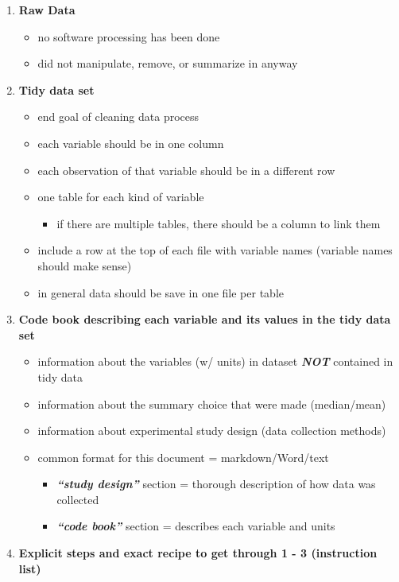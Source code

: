 \documentclass[
]{article}
\providecommand{\tightlist}{%
  \setlength{\itemsep}{0pt}\setlength{\parskip}{0pt}}
\begin{document}
\begin{enumerate}
\def\labelenumi{\arabic{enumi}.}
\tightlist
\item
  \textbf{Raw Data}

  \begin{itemize}
  \tightlist
  \item
    no software processing has been done
  \item
    did not manipulate, remove, or summarize in anyway
  \end{itemize}
\item
  \textbf{Tidy data set}

  \begin{itemize}
  \tightlist
  \item
    end goal of cleaning data process
  \item
    each variable should be in one column
  \item
    each observation of that variable should be in a different row
  \item
    one table for each kind of variable

    \begin{itemize}
    \tightlist
    \item
      if there are multiple tables, there should be a column to link
      them
    \end{itemize}
  \item
    include a row at the top of each file with variable names (variable
    names should make sense)
  \item
    in general data should be save in one file per table
  \end{itemize}
\item
  \textbf{Code book describing each variable and its values in the tidy
  data set}

  \begin{itemize}
  \tightlist
  \item
    information about the variables (w/ units) in dataset
    \textbf{\emph{NOT}} contained in tidy data
  \item
    information about the summary choice that were made (median/mean)
  \item
    information about experimental study design (data collection
    methods)
  \item
    common format for this document = markdown/Word/text

    \begin{itemize}
    \tightlist
    \item
      \textbf{\emph{``study design''}} section = thorough description of
      how data was collected
    \item
      \textbf{\emph{``code book''}} section = describes each variable
      and units
    \end{itemize}
  \end{itemize}
\item
  \textbf{Explicit steps and exact recipe to get through 1 - 3
  (instruction list)}


\end{enumerate}
\end{document}
